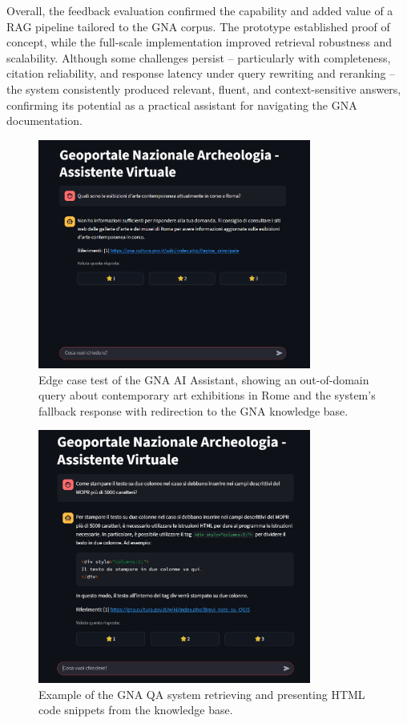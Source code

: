 \begin{spacing}{1.5}
\noindent Overall, the feedback evaluation confirmed the capability and added value of a RAG pipeline tailored to the GNA corpus. The prototype established proof of concept, while the full-scale implementation improved retrieval robustness and scalability. Although some challenges persist -- particularly with completeness, citation reliability, and response latency under query rewriting and reranking -- the system consistently produced relevant, fluent, and context-sensitive answers, confirming its potential as a practical assistant for navigating the GNA documentation.

\vspace{0.5em}
\begin{figure}[H]
  \centering
  \includegraphics[width=0.8\textwidth]{images/edge_case_response.png} 
  \caption{Edge case test of the GNA AI Assistant, showing an out-of-domain query about contemporary art exhibitions in Rome and the system’s fallback response with redirection to the GNA knowledge base.}
  \label{fig:edge-case}
\end{figure}

\begin{figure}[H]
  \centering
  \includegraphics[width=0.8\textwidth]{images/risposta_assistente_con_codice.png} 
  \caption{Example of the GNA QA system retrieving and presenting HTML code snippets from the knowledge base.}
  \label{fig:edge-case_code}
\end{figure}


\end{spacing}